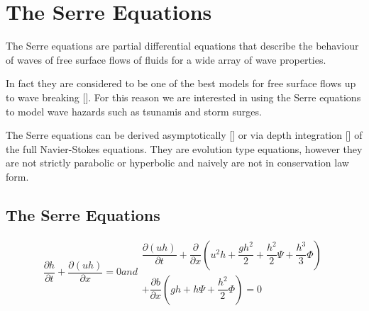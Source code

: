 
\chapter{The Serre Equations}
\label{chp:Serreeqns}

The Serre equations are partial differential equations that describe the behaviour of waves of free surface flows of fluids for a wide array of wave properties. 




In fact they are considered to be one of the best models for free surface flows up to wave breaking []. For  this reason we are interested in using the Serre equations to model wave hazards such as tsunamis and storm surges. 

The Serre equations can be derived asymptotically [] or via depth integration [] of the full Navier-Stokes equations. They are evolution type equations, however they are not strictly parabolic or hyperbolic and naively are not in conservation law form.  



\section{The Serre Equations}

\begin{subequations}
	\label{eqn:FullSerreNonCon}
	\begin{equation}
	\label{eqn:FullSerreNonConMass}
	\frac{\partial h}{\partial t} + \dfrac{\partial (uh)}{\partial x} = 0
	\end{equation}
	
	and
	
	\begin{multline}
	\label{eqn:FullSerreNonConMome}
    	\dfrac{\partial (uh)}{\partial t} + \dfrac{\partial}{\partial x} \left ( u^2h + \dfrac{gh^2}{2} + \dfrac{h^2}{2}{\Psi} + \dfrac{h^3}{3}{ \Phi }  \right )  \\+  \dfrac{\partial b}{\partial x} \left (gh +   h \Psi + \dfrac{h^2}{2}{ \Phi }  \right ) = 0
   	\end{multline}
\end{subequations}	

